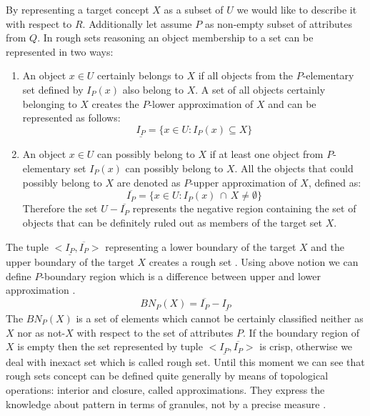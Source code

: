 By representing a target concept $X$ as a subset of $U$ we would like to
describe it with respect to $R$. Additionally let assume $P$ as non-empty
subset of attributes from $Q$. In rough sets reasoning an object membership to a
set can be represented in two ways:
\begin{enumerate}
    \item An object $x \in U$ certainly belongs to $X$ if
        all objects from the $P$-elementary set defined by $I_P(x)$ also belong to $X$.
        A set of all objects certainly belonging to $X$ creates the $P$-lower
        approximation of $X$ and can be represented as follows:
        \begin{equation}
            \underline{I_P} = \{ x \in U: I_P(x) \subseteq X\}
            \label{eq:lower_approximation}
        \end{equation}
    \item An object $x \in U$ can possibly belong to $X$ if at least one object
        from $P$-elementary set $I_P(x)$ can possibly belong to $X$. All the
        objects that could possibly belong to $X$ are denoted as $P$-upper
        approximation of $X$, defined as:
        \begin{equation}
            \overline{I_P} = \{x\in U: I_P(x) \, \cap \, X \neq \emptyset \}
            \label{eq:upper_approximation}
        \end{equation}
        Therefore the set $U - \overline{I_P}$ represents the negative region
        containing the set of objects that can be definitely ruled out as
        members of the target set $X$.
\end{enumerate}

The tuple $<\underline{I_P}, \overline{I_P}>$ representing a lower boundary of
the target $X$ and the upper boundary of the target $X$ creates a rough set \cite{bib34}.
Using above notion we can define $P$-boundary region which is a difference
between upper and lower approximation \cite{bib14}. 
\begin{equation}
    BN_P(X) = \overline{I_P} - \underline{I_P}
    \label{eq:boundary_region}
\end{equation}
The $BN_P(X)$ is a set of elements which cannot be certainly classified neither
as $X$ nor as not-$X$ with respect to the set of attributes $P$. If the
boundary region of $X$ is empty then the set represented by tuple
$<\underline{I_P}, \overline{I_P}>$ 
is crisp, otherwise we deal with inexact set which is called rough set. 
Until this moment we can see that rough sets concept can be defined quite generally by means of topological
operations: interior and closure, called approximations. They express the
knowledge about pattern in terms of granules, not by a precise measure
\cite{bib40}.

